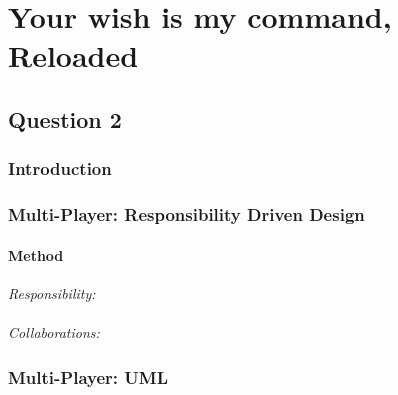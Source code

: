 \chapter{Your wish is my command, Reloaded}

\section{Question 2}


\subsection{Introduction}

\subsection{Multi-Player: Responsibility Driven Design}

\subsubsection{Method}
\textit{Responsibility:} \\
\\
\textit{Collaborations:} \\

\subsection{Multi-Player: UML}



